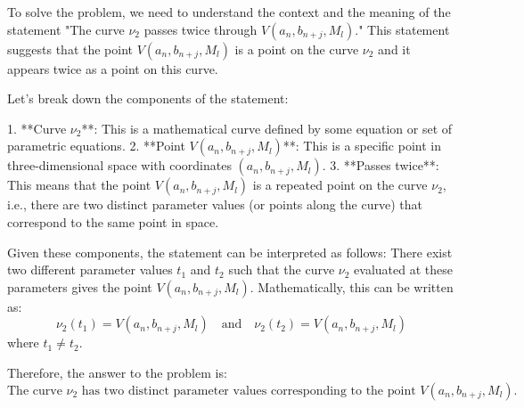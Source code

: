 To solve the problem, we need to understand the context and the meaning of the statement "The curve \(\nu_2\) passes twice through \(V(a_n, b_{n+j}, M_l)\)." This statement suggests that the point \(V(a_n, b_{n+j}, M_l)\) is a point on the curve \(\nu_2\) and it appears twice as a point on this curve.

Let's break down the components of the statement:

1. **Curve \(\nu_2\)**: This is a mathematical curve defined by some equation or set of parametric equations.
2. **Point \(V(a_n, b_{n+j}, M_l)\)**: This is a specific point in three-dimensional space with coordinates \((a_n, b_{n+j}, M_l)\).
3. **Passes twice**: This means that the point \(V(a_n, b_{n+j}, M_l)\) is a repeated point on the curve \(\nu_2\), i.e., there are two distinct parameter values (or points along the curve) that correspond to the same point in space.

Given these components, the statement can be interpreted as follows: There exist two different parameter values \(t_1\) and \(t_2\) such that the curve \(\nu_2\) evaluated at these parameters gives the point \(V(a_n, b_{n+j}, M_l)\). Mathematically, this can be written as:
\[
\nu_2(t_1) = V(a_n, b_{n+j}, M_l) \quad \text{and} \quad \nu_2(t_2) = V(a_n, b_{n+j}, M_l)
\]
where \(t_1 \neq t_2\).

Therefore, the answer to the problem is:
\[
\boxed{\text{The curve } \nu_2 \text{ has two distinct parameter values corresponding to the point } V(a_n, b_{n+j}, M_l).}
\]